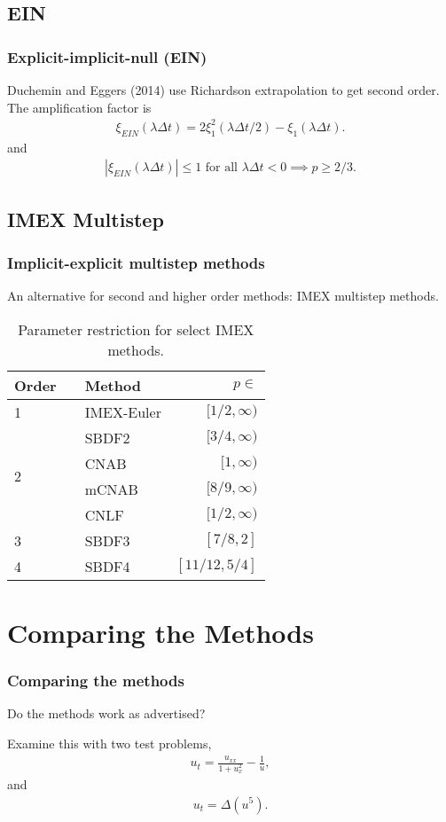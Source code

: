 \documentclass[hyperref={pdfpagelabels=false}]{beamer}
\begin{document}
\subsection{EIN} 
\begin{frame}
	\frametitle{Explicit-implicit-null (EIN)} 
Duchemin and Eggers (2014) use Richardson extrapolation to get second order. The amplification factor is  
	\begin{align*}
		\xi_{EIN}(\lambda\Delta t) 
		= 2\xi^2_1(\lambda\Delta t/2) - \xi_1(\lambda\Delta t).
	\end{align*}
and 
	\begin{align*}
		\left\vert \xi_{EIN}(\lambda\Delta t) \right\vert \leq 1 \text{ for all } \lambda\Delta t < 0 \implies p \geq 2/3.
	\end{align*}
\end{frame}

\subsection{IMEX Multistep}
\begin{frame}
	\frametitle{Implicit-explicit multistep methods}
An alternative for second and higher order methods: IMEX multistep methods.
\vspace{-10pt}
\begin{table}[htb!]
	\centering  
	\caption{Parameter restriction for select IMEX methods.}
	\begin{tabular}{lllr}
		\toprule
		Order && Method & $p\in$
		\\ \midrule 
		1 && IMEX-Euler & $[1/2,\infty)$ 
		\\ \cmidrule{1-3}
		\multirow{4}{*}{2} && SBDF2 & $[3/4,\infty)$
		\\
		&& CNAB & $[1,\infty)$ 
		\\
		&& mCNAB & $[8/9,\infty)$ 
		\\
		&& CNLF & $[1/2,\infty)$
		\\ \cmidrule{1-3}
		3 && SBDF3 & $[7/8,2]$ 
		\\ \cmidrule{1-3}
		4 && SBDF4 & $[11/12,5/4]$
		\\
		\bottomrule
	\end{tabular}
\end{table}
\end{frame}

\section{Comparing the Methods} 
\begin{frame}
	\frametitle{Comparing the methods}
Do the methods work as advertised? 	

Examine this with two test problems,
	\begin{align*}
		u_t = \frac{u_{xx}}{1 + u_x^2} - \frac{1}{u}, 
	\end{align*}
and 
	\begin{align*}
		u_t = \Delta(u^5).
	\end{align*}
\end{frame}
\end{document}
